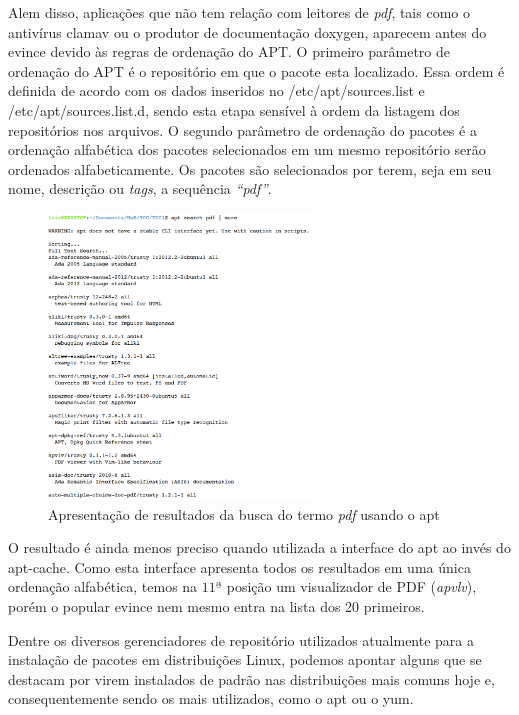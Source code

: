 Alem disso, aplicações que não tem relação com leitores de \textit{pdf}, tais como o antivírus {\code clamav} ou o produtor de documentação {\code doxygen}, aparecem antes do {\code evince} devido às regras de ordenação do APT. O primeiro parâmetro de ordenação do {\code APT} é o repositório em que o pacote esta localizado. Essa ordem é definida de acordo com os dados inseridos no {\code /etc/apt/sources.list} e {\code /etc/apt/sources.list.d}, sendo esta etapa sensível à ordem da listagem dos repositórios nos arquivos. O segundo parâmetro de ordenação do pacotes é a ordenação alfabética dos pacotes selecionados em um mesmo repositório serão ordenados alfabeticamente. Os pacotes são selecionados por terem, seja em seu nome, descrição ou \textit{tags}, a sequência \textit{``pdf''}.

\begin{figure}[h]
  \centering
	\includegraphics[width=0.62\textwidth]{figuras/search_pdf_ii}
  \caption{Apresentação de resultados da busca do termo \textit{pdf} usando o {\code apt}}
  \label{fig:figuras_search_pdf_ii}
\end{figure}

O resultado é ainda menos preciso quando utilizada a interface do {\code apt} ao invés do {\code apt-cache}. Como esta interface apresenta todos os resultados em uma única ordenação alfabética, temos na $11ª$ posição um visualizador de PDF (\textit{apvlv}), porém o popular {\code evince} nem mesmo entra na lista dos 20 primeiros.


Dentre os diversos gerenciadores de repositório utilizados atualmente para a instalação de pacotes em distribuições Linux, podemos apontar alguns que se destacam por virem instalados de padrão nas distribuições mais comuns hoje e, consequentemente sendo os mais  utilizados, como o {\code apt} ou o {\code yum}.

